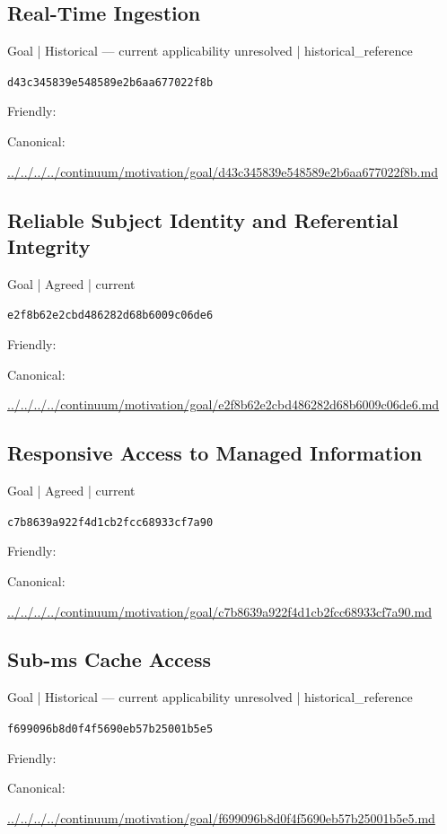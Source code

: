 \documentclass[10pt,a4paper]{article}
\begin{document}
\subsection*{Real-Time Ingestion}
{\small Goal | Historical — current applicability unresolved | historical\_reference}\par
\texttt{d43c345839e548589e2b6aa677022f8b}\par
Friendly: \par
Canonical: \par
{\footnotesize\url{../../../../continuum/motivation/goal/d43c345839e548589e2b6aa677022f8b.md}}\par
\subsection*{Reliable Subject Identity and Referential Integrity}
{\small Goal | Agreed | current}\par
\texttt{e2f8b62e2cbd486282d68b6009c06de6}\par
Friendly: \par
Canonical: \par
{\footnotesize\url{../../../../continuum/motivation/goal/e2f8b62e2cbd486282d68b6009c06de6.md}}\par
\subsection*{Responsive Access to Managed Information}
{\small Goal | Agreed | current}\par
\texttt{c7b8639a922f4d1cb2fcc68933cf7a90}\par
Friendly: \par
Canonical: \par
{\footnotesize\url{../../../../continuum/motivation/goal/c7b8639a922f4d1cb2fcc68933cf7a90.md}}\par
\subsection*{Sub-ms Cache Access}
{\small Goal | Historical — current applicability unresolved | historical\_reference}\par
\texttt{f699096b8d0f4f5690eb57b25001b5e5}\par
Friendly: \par
Canonical: \par
{\footnotesize\url{../../../../continuum/motivation/goal/f699096b8d0f4f5690eb57b25001b5e5.md}}\par
\end{document}
